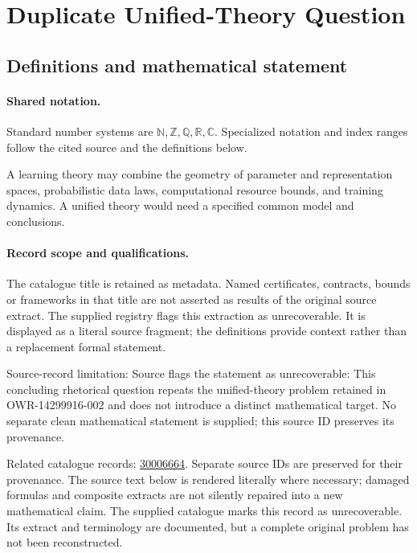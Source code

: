 \documentclass[11pt]{article}
\begin{document}
\section{Duplicate Unified-Theory Question}\label{statement}

\subsection{Definitions and mathematical statement}

\paragraph{Shared notation.}Standard number systems are $\mathbb N,\mathbb Z,\mathbb Q,\mathbb R,\mathbb C$. Specialized notation and index ranges follow the cited source and the definitions below.


A learning theory may combine the geometry of parameter and representation spaces, probabilistic data laws, computational resource bounds, and training dynamics. A unified theory would need a specified common model and conclusions.
\paragraph{Record scope and qualifications.}
The catalogue title is retained as metadata. Named certificates, contracts, bounds or frameworks in that title are not asserted as results of the original source extract.
The supplied registry flags this extraction as unrecoverable. It is displayed as a literal source fragment; the definitions provide context rather than a replacement formal statement.

Source-record limitation: Source flags the statement as unrecoverable: This concluding rhetorical question repeats the unified-theory problem retained in OWR-14299916-002 and does not introduce a distinct mathematical target. No separate clean mathematical statement is supplied; this source ID preserves its provenance.

Related catalogue records: \href{https://mehmetmars7.github.io/Erdosproblems-llm-hunter/problem.html?type=open_problems&id=30006664}{30006664}. Separate source IDs are preserved for their provenance.
The source text below is rendered literally where necessary; damaged formulas and composite extracts are not silently repaired into a new mathematical claim.
The supplied catalogue marks this record as unrecoverable. Its extract and terminology are documented, but a complete original problem has not been reconstructed.
\end{document}
